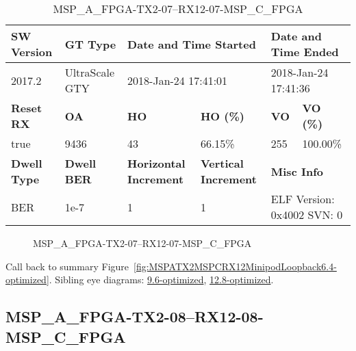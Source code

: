 \begin{table}[h]
\centering
\caption{MSP\_A\_FPGA-TX2-07--RX12-07-MSP\_C\_FPGA}
\label{tab:MSPAFPGATX207RX1207MSPCFPGA6.4-optimized}
\begin{tabular}{@{}|l|l|l|l|l|l|@{}}
\toprule
\textbf{SW Version}                & \textbf{GT Type}   & \multicolumn{2}{l|}{\textbf{Date and Time Started}}            & \multicolumn{2}{l|}{\textbf{Date and Time Ended}}        \\ \midrule
2017.2                       & UltraScale GTY          & \multicolumn{2}{l|}{2018-Jan-24 17:41:01}                   & \multicolumn{2}{l|}{2018-Jan-24 17:41:36}               \\ \midrule
\textbf{Reset RX}                  & \textbf{OA} & \textbf{HO}   & \textbf{HO (\%)} & \textbf{VO} & \textbf{VO (\%)} \\ \midrule
true & 9436        & 43          & 66.15\%        & 255        & 100.00\%       \\ \midrule
\textbf{Dwell Type}                & \textbf{Dwell BER} & \textbf{Horizontal Increment} & \textbf{Vertical Increment}    & \multicolumn{2}{l|}{\textbf{Misc Info}}                  \\ \midrule
BER                            & 1e-7        & 1        & 1           & \multicolumn{2}{l|}{ELF Version: 0x4002 SVN: 0}                         \\ \bottomrule
\end{tabular}
\end{table}

\begin{figure}[h]
\caption{MSP\_A\_FPGA-TX2-07--RX12-07-MSP\_C\_FPGA} \label{fig:MSPAFPGATX207RX1207MSPCFPGA6.4-optimized}
\end{figure}

Call back to summary Figure~\ref{fig:MSPATX2MSPCRX12MinipodLoopback6.4-optimized}.
Sibling eye diagrams: \hyperref[sec:MSPAFPGATX207RX1207MSPCFPGA9.6-optimized]{9.6-optimized}, \hyperref[sec:MSPAFPGATX207RX1207MSPCFPGA12.8-optimized]{12.8-optimized}.

\clearpage
\newpage


\subsection{MSP\_A\_FPGA-TX2-08--RX12-08-MSP\_C\_FPGA}\label{sec:MSPAFPGATX208RX1208MSPCFPGA6.4-optimized}

